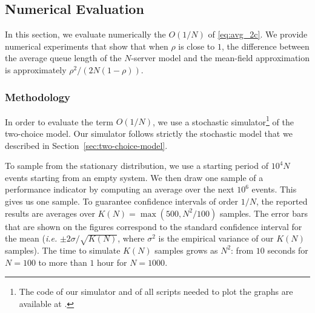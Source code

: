 \documentclass[sigconf]{acmart}
\begin{document}
\subsection{Numerical Evaluation}

In this section, we evaluate numerically the $O(1/N)$ of
\eqref{eq:avg_2c}. We provide numerical experiments that show that
when $\rho$ is close to $1$, the difference between the average queue
length of the $N$-server model and the mean-field approximation is
approximately $\rho^2/(2N(1-\rho))$.

\subsubsection{Methodology}

In order to evaluate the term $O(1/N)$, we use a stochastic
simulator\footnote{The code of our simulator and of all scripts needed
  to plot the graphs are available at \githublink.} of the two-choice
model. Our simulator follows strictly the stochastic model that we
described in Section~\ref{sec:two-choice-model}.

To sample from the stationary distribution, we use a starting period
of $10^4N$ events starting from an empty system. We then draw one
sample of a performance indicator by computing an average over the
next $10^6$ events. This gives us one sample. To guarantee confidence
intervals of order $1/N$, the reported results are averages over
$K(N)=\max(500,N^2/100)$ samples. The error bars that are shown on the
figures correspond to the standard confidence interval for the mean
(\emph{i.e.} $\pm2\sigma/\sqrt{K(N)}$, where $\sigma^2$ is the
empirical variance of our $K(N)$ samples).  The time to simulate
$K(N)$ samples grows as $N^2$: from $10$ seconds for $N=100$ to more
than $1$ hour for $N=1000$.
\end{document}
